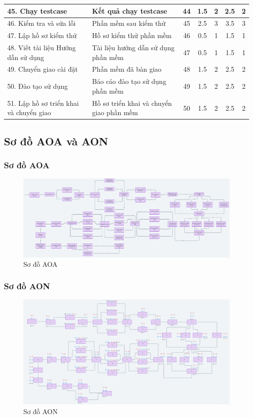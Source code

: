 \begin{longtable}{|p{5cm}|p{5cm}|c|c|c|c|c|}
    45. Chạy testcase & Kết quả chạy testcase & 44 & 1.5 & 2 & 2.5 & 2 \\ \hline
    46. Kiểm tra và sửa lỗi & Phần mềm sau kiểm thử & 45 & 2.5 & 3 & 3.5 & 3 \\ \hline
    47. Lập hồ sơ kiểm thử & Hồ sơ kiểm thử phần mềm & 46 & 0.5 & 1 & 1.5 & 1 \\ \hline
    48. Viết tài liệu Hướng dẫn sử dụng & Tài liệu hướng dẫn sử dụng phần mềm & 47 & 0.5 & 1 & 1.5 & 1 \\ \hline
    49. Chuyển giao cài đặt & Phần mềm đã bàn giao & 48 & 1.5 & 2 & 2.5 & 2 \\ \hline
    50. Đào tạo sử dụng & Báo cáo đào tạo sử dụng phần mềm & 49 & 1.5 & 2 & 2.5 & 2 \\ \hline
    51. Lập hồ sơ triển khai và chuyển giao & Hồ sơ triển khai và chuyển giao phần mềm & 50 & 1.5 & 2 & 2.5 & 2 \\ \hline
\end{longtable}

\subsection{Sơ đồ AOA và AON}
\subsubsection{Sơ đồ AOA}
\begin{figure}[H]
    \centering
    \includegraphics[width=\textwidth]{images/aoa.png}
    \caption{Sơ đồ AOA}
\end{figure}
\subsubsection{Sơ đồ AON}
\begin{figure}[H]
    \centering
    \includegraphics[width=\textwidth]{images/aon.png}
    \caption{Sơ đồ AON}
\end{figure}

